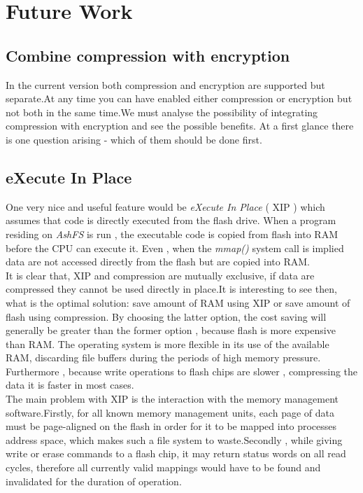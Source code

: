 \documentclass[conference]{IEEEtran}
\begin{document}
\section{Future Work}



\subsection{Combine compression with encryption}
In the current version both compression and encryption are supported but separate.At any time you can have 
enabled either compression or encryption but not both in the same time.We must analyse the possibility of 
integrating compression with encryption and see the possible benefits. At a first glance there is one question arising - which of them should be 
done first. 
\subsection{eXecute In Place}
One very nice and useful feature would be {\em eXecute In Place} ( XIP ) which assumes that code is
directly executed from the flash drive. When a program residing on {\em AshFS } is run , the executable
code is copied from flash into RAM before the CPU can execute it. Even , when the {\em mmap() } system 
call is implied data are not accessed directly from the flash but are copied into RAM. \\

It is clear that, XIP and compression are mutually exclusive, if data are compressed they cannot be 
used directly in place.It is interesting to see then, what is the optimal solution: save amount of RAM using
XIP or save amount of flash using compression. By choosing the latter option, the cost saving will generally 
be greater than the former option , because flash is more expensive than RAM. The operating system is more 
flexible in its use of the available RAM, discarding file buffers during the periods of high memory pressure.
Furthermore , because write operations to flash chips are slower , compressing the  data it is faster in most 
cases.\\

The main problem with XIP is the interaction with the memory management software.Firstly, for all known memory 
management units, each page of data must be page-aligned on the flash in order for it to be mapped into 
processes address space, which makes such a file system to waste.Secondly , while giving write or erase 
commands to a flash chip, it may return status words on all read cycles, therefore all currently valid mappings
would have to be found and invalidated for the duration of operation.
\end{document}
